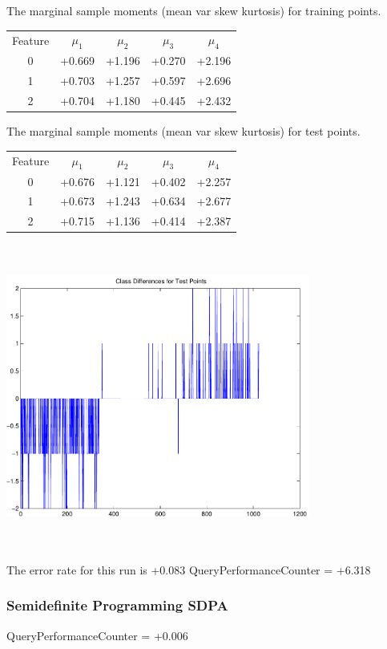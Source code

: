 \documentclass[9pt]{article}
\theoremstyle{plain}
\theoremstyle{definition}
\theoremstyle{remark}
\numberwithin{equation}{section}
\begin{document}
The marginal sample moments (mean var skew kurtosis) for training points.\newline
\begin{tabular}{ c |  c  c  c  c}
Feature & $\mu_1$ & $\mu_2$ & $\mu_3$ & $\mu_4$ \\
0 & +0.669 & +1.196 & +0.270& +2.196 \\
\hline
1 & +0.703 & +1.257 & +0.597& +2.696 \\
\hline
2 & +0.704 & +1.180 & +0.445& +2.432 \\
\hline
\end{tabular}
\newline
The marginal sample moments (mean var skew kurtosis) for test points.\newline
\begin{tabular}{ c | c  c  c  c}
Feature & $\mu_1$ & $\mu_2$ & $\mu_3$ & $\mu_4$ \\
0 & +0.676 & +1.121 & +0.402& +2.257\\
\hline
1 & +0.673 & +1.243 & +0.634& +2.677\\
\hline
2 & +0.715 & +1.136 & +0.414& +2.387\\
\hline
\end{tabular}\newline
\includegraphics[width=10.0cm,height=10.0cm]{classDiffs.pdf}

The error rate for this run is +0.083\newline
QueryPerformanceCounter  =  +6.318
\subsubsection{Semidefinite Programming SDPA}
QueryPerformanceCounter  =  +0.006
\end{document}
